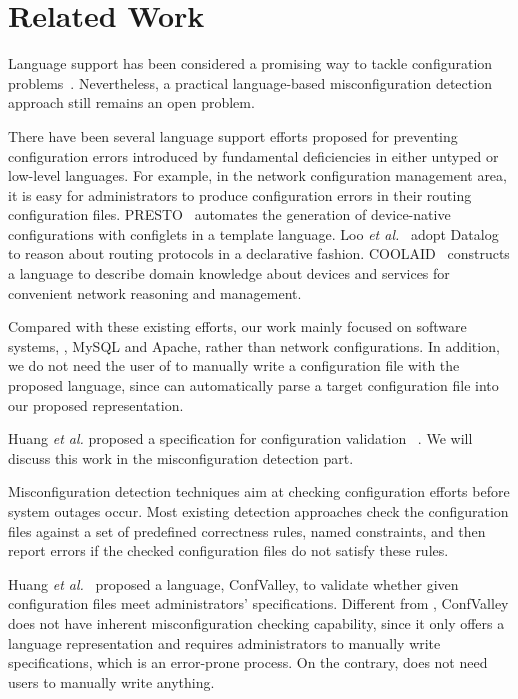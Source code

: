 
\section{Related Work}

Language support has been considered a promising way  
to tackle configuration problems~\cite{xu15systems}.
Nevertheless, a practical language-based misconfiguration
detection approach still remains an open problem.

There have been several language support efforts proposed for preventing
configuration errors introduced by fundamental deficiencies in
either untyped or low-level languages. For example, in the network
configuration management area, it is easy for administrators to
produce configuration errors in their routing configuration files.
PRESTO~\cite{enck07configuration} 
automates the generation of device-native configurations
with configlets in a template language. 
Loo {\em et al.}~\cite{loo05declarative} adopt Datalog to reason about 
routing protocols in a declarative fashion. 
COOLAID~\cite{chen10declarative} constructs
a language to describe domain knowledge about devices and
services for convenient network reasoning and management.

Compared with these existing efforts, 
our work mainly focused on software systems, \eg, MySQL and Apache,
rather than network configurations. In addition, we do not need 
the user of \app to manually write a configuration file with the proposed
language, since \app can automatically parse a target configuration
file into our proposed representation.

Huang {\em et al.} proposed a specification for configuration validation%
~\cite{huang15confvalley}. We will 
discuss this work in the misconfiguration
detection part.

Misconfiguration detection techniques aim at checking configuration
efforts before system outages occur.
Most existing detection approaches check 
the configuration files against a set of predefined correctness 
rules, named constraints, and then report errors if 
the checked configuration files do not satisfy these rules.

Huang {\em et al.}~\cite{huang15confvalley} proposed a 
language, ConfValley, to validate 
whether given configuration files meet administrators' specifications. 
Different from \app, ConfValley does not
have inherent misconfiguration checking capability, since it only offers
a language representation and requires administrators to
manually write specifications, which is an error-prone
process. On the contrary, \app does not need users to manually
write anything.

